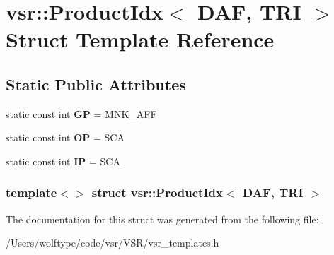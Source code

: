 \hypertarget{structvsr_1_1_product_idx_3_01_d_a_f_00_01_t_r_i_01_4}{\section{vsr\-:\-:Product\-Idx$<$ D\-A\-F, T\-R\-I $>$ Struct Template Reference}
\label{structvsr_1_1_product_idx_3_01_d_a_f_00_01_t_r_i_01_4}
}
\subsection*{Static Public Attributes}
\begin{DoxyCompactItemize}
\item 
\hypertarget{structvsr_1_1_product_idx_3_01_d_a_f_00_01_t_r_i_01_4_a068442871aabccca22bcfa06eb0b4ba0}{static const int {\bfseries G\-P} = M\-N\-K\-\_\-\-A\-F\-F}\label{structvsr_1_1_product_idx_3_01_d_a_f_00_01_t_r_i_01_4_a068442871aabccca22bcfa06eb0b4ba0}

\item 
\hypertarget{structvsr_1_1_product_idx_3_01_d_a_f_00_01_t_r_i_01_4_ad4d4508095b99a0a11b783f48dad4eed}{static const int {\bfseries O\-P} = S\-C\-A}\label{structvsr_1_1_product_idx_3_01_d_a_f_00_01_t_r_i_01_4_ad4d4508095b99a0a11b783f48dad4eed}

\item 
\hypertarget{structvsr_1_1_product_idx_3_01_d_a_f_00_01_t_r_i_01_4_abe7c4c1aa04a05e15f7040405e59567b}{static const int {\bfseries I\-P} = S\-C\-A}\label{structvsr_1_1_product_idx_3_01_d_a_f_00_01_t_r_i_01_4_abe7c4c1aa04a05e15f7040405e59567b}

\end{DoxyCompactItemize}
\subsubsection*{template$<$$>$ struct vsr\-::\-Product\-Idx$<$ D\-A\-F, T\-R\-I $>$}



The documentation for this struct was generated from the following file\-:\begin{DoxyCompactItemize}
\item 
/\-Users/wolftype/code/vsr/\-V\-S\-R/vsr\-\_\-templates.\-h\end{DoxyCompactItemize}
